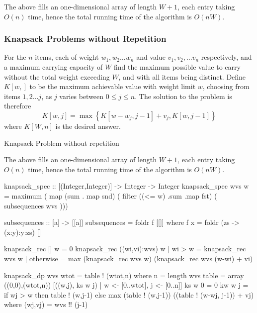 \documentclass[10pt]{article}
\begin{document}
The above fills an one-dimensional array of length $W+1$, each entry taking $O(n)$ time, hence the total running time of the algorithm is $O(nW)$.
\subsubsection{Knapsack Problems without Repetition}
For the $n$ items, each of weight $w_1,w_2\ldots w_n$ and value $v_1,v_2, \ldots v_n$ respectively, and a maximum carrying capacity of $W$ find the maximum possible value to carry without the total weight exceeding $W$, and with all items being distinct.
Define $K[w,]$ to be the maximum achievable value with weight limit $w$, choosing from items $1,2\ldots j$, as $j$ varies between $0\le j \le n$.  The solution to the problem is therefore \[K[w,j] = \max\left\{K[w-w_j,j-1]+v_j, K[w,j-1]\right\}\]where $K[W,n]$ is the desired answer.
\begin{algorithm}
\caption{Knapsack Problem without repetition}
\;
\end{algorithm}

The above fills an one-dimensional array of length $W+1$, each entry taking $O(n)$ time, hence the total running time of the algorithm is $O(nW)$.
\begin{code}
knapsack_spec :: [(Integer,Integer)] -> Integer -> Integer
knapsack_spec wvs w = 
      maximum ( map (sum . map snd) (
      filter ((<= w) .sum .map fst) (
      subsequences wvs )))

subsequences :: [a] -> [[a]] 
subsequences = foldr f [[]] 
  where f x = foldr (\y zs -> (x:y):y:zs) []

knapsack_rec [] w = 0
knapsack_rec ((wi,vi):wvs) w
  | wi > w = knapsack_rec wvs w
  | otherwise = max (knapsack_rec wvs w) (knapsack_rec wvs (w-wi) + vi)

knapsack_dp wvs wtot = table ! (wtot,n)
  where n = length wvs
        table = array ((0,0),(wtot,n)) [((w,j), ks w j) | w <- [0..wtot], j <- [0..n]]
        ks w 0 = 0
        kw w j = if wj > w then table ! (w,j-1)
                 else max (table ! (w,j-1))
                   ((table ! (w-wj, j-1)) + vj)
          where (wj,vj) = wvs !! (j-1)
\end{code}
\end{document}
